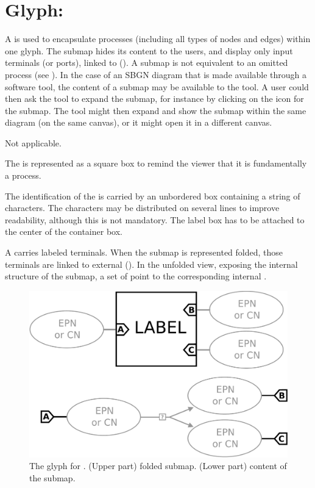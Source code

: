 
\section{Glyph: }
\label{sec:submap}

A  is used to encapsulate processes (including all types of nodes and edges) within one glyph.  The submap hides its content to the users, and display only input terminals (or ports), linked to  ().  A submap is not equivalent to an omitted process (see ).  In the case of an SBGN diagram that is made available through a software tool, the content of a submap may be available to the tool.  A user could then ask the tool to expand the submap, for instance by clicking on the icon for the submap.  The tool might then expand and show the submap within the same diagram (on the same canvas), or it might open it in a different canvas.

\begin{glyphDescription}

\glyphSboTerm Not applicable.

\glyphContainer The  is represented as a square box to remind the viewer that it is fundamentally a process.

\glyphLabel The identification of the  is carried by an unbordered box containing a string of characters.  The characters may be distributed on several lines to improve readability, although this is not mandatory.  The label box has to be attached to the center of the container box.

\glyphAux A  carries labeled terminals.  When the submap is represented folded, those terminals are linked to external  ().  In the unfolded view, exposing the internal structure of the submap, a set of  point to the corresponding internal  .

\end{glyphDescription}


\begin{figure}[H]
  \centering
  \includegraphics[scale = 0.22]{images/submap}
  \caption{The \PD glyph for . (Upper part) folded submap. (Lower part) content of the submap.}
  \label{fig:submap}
\end{figure}


